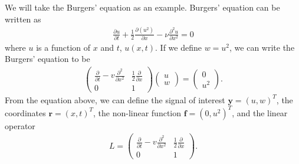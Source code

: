 We will take the Burgers' equation as an example.
Burgers' equation can be written as
\begin{align}
    \frac{\partial u}{\partial t} + \frac{1}{2}\frac{\partial (u^2)}{\partial x} - \nu \frac{\partial^2 u}{\partial x^2} = 0
\end{align}
where $u$ is a function of $x$ and $t$, $u(x, t)$.
If we define $w = u^2$, we can write the Burgers' equation to be
\begin{align}
    \left(\begin{matrix}
        \frac{\partial}{\partial t} - v \frac{\partial^2}{\partial x^2} & \frac{1}{2}\frac{\partial}{\partial x} \\ 0 & 1
    \end{matrix}\right) \left(\begin{matrix}
        u \\ w
    \end{matrix}\right) = \left(\begin{matrix}
        0 \\ u^2
    \end{matrix}\right).
\end{align}
From the equation above, we can define the signal of interest $\mathbf{y} = (u, w)^T$, the coordinates $\mathbf{r}=(x, t)^T$, the non-linear function $\mathbf{f} = (0, u^2)^T$, and the linear operator
\begin{align}
    L = \left(\begin{matrix}
        \frac{\partial}{\partial t} - v \frac{\partial^2}{\partial x^2} & \frac{1}{2}\frac{\partial}{\partial x} \\ 0 & 1
    \end{matrix}\right).
\end{align}

